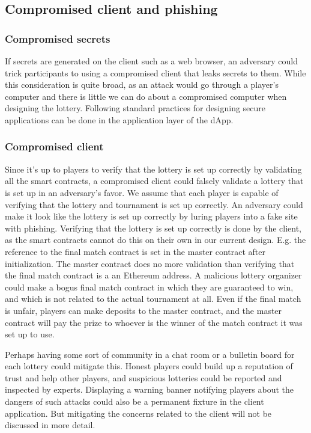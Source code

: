\subsection{Compromised client and phishing}

\subsubsection{Compromised secrets}
If secrets are generated on the client such as a web browser, an adversary could trick participants to using a compromised client that leaks secrets to them. While this consideration is quite broad, as an attack would go through a player's computer and there is little we can do about a compromised computer when designing the lottery. Following standard practices for designing secure applications can be done in the application layer of the dApp.

\subsubsection{Compromised client}
Since it's up to players to verify that the lottery is set up correctly by validating all the smart contracts, a compromised client could falsely validate a lottery that is set up in an adversary's favor. We assume that each player is capable of verifying that the lottery and tournament is set up correctly. An adversary could make it look like the lottery is set up correctly by luring players into a fake site with phishing. Verifying that the lottery is set up correctly is done by the client, as the smart contracts cannot do this on their own in our current design. E.g. the reference to the final match contract is set in the master contract after initialization. The master contract does no more validation than verifying that the final match contract is a an Ethereum address. A malicious lottery organizer could make a bogus final match contract in which they are guaranteed to win, and which is not related to the actual tournament at all. Even if the final match is unfair, players can make deposits to the master contract, and the master contract will pay the prize to whoever is the winner of the match contract it was set up to use.

Perhaps having some sort of community in a chat room or a bulletin board for each lottery could mitigate this. Honest players could build up a reputation of trust and help other players, and suspicious lotteries could be reported and inspected by experts. Displaying a warning banner notifying players about the dangers of such attacks could also be a permanent fixture in the client application. But mitigating the concerns related to the client will not be discussed in more detail.
